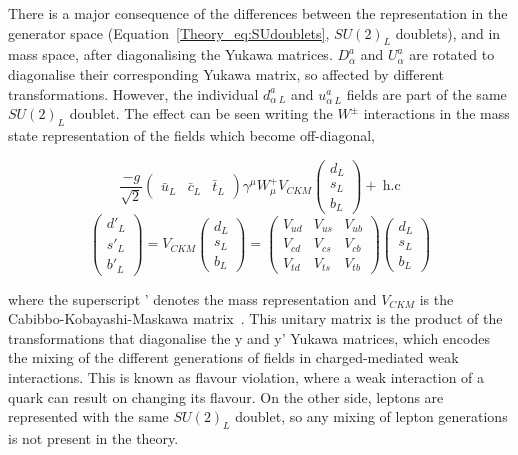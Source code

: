 There is a major consequence of the differences between the representation in the generator space (Equation~\ref{Theory_eq:SUdoublets}, $SU(2)_L$ doublets), and in mass space, after diagonalising the Yukawa matrices. $D^a_{\alpha}$ and $U^a_{\alpha}$ are rotated to diagonalise their corresponding Yukawa matrix, so affected by different transformations. However, the individual $d^a_{\alpha\ L}$ and $u^a_{\alpha\ L}$ fields are part of the same $SU(2)_L$ doublet. The effect can be seen writing the $W^\pm$ interactions in the mass state representation of the fields which become off-diagonal,

\begin{equation}
    \frac{-g}{\sqrt{2}} \begin{pmatrix} \bar{u}_L & \bar{c}_L & \bar{t}_L \end{pmatrix} \gamma^\mu W_\mu^+ V_{CKM} \begin{pmatrix} d_L \\ s_L \\ b_L \end{pmatrix} +\ \text{h.c}
\end{equation}
\begin{equation}
\begin{pmatrix} d'_L \\ s'_L \\ b'_L \end{pmatrix} = V_{CKM}\begin{pmatrix} d_L \\ s_L \\ b_L \end{pmatrix} =\begin{pmatrix} V_{ud} & V_{us} & V_{ub} \\ V_{cd} & V_{cs} & V_{cb} \\ V_{td} & V_{ts} & V_{tb} \end{pmatrix} \begin{pmatrix} d_L \\ s_L \\ b_L \end{pmatrix}
\end{equation}

where the superscript ' denotes the mass representation and $V_{CKM}$ is the Cabibbo-Kobayashi-Maskawa matrix~\cite{Cabibbo,KobayaMaska}. This unitary matrix is the product of the transformations that diagonalise the y and y' Yukawa matrices, which encodes the mixing of the different generations of fields in charged-mediated weak interactions. This is known as flavour violation, where a weak interaction of a quark can result on changing its flavour. On the other side, leptons are represented with the same $SU(2)_L$ doublet, so any mixing of lepton generations is not present in the theory.

